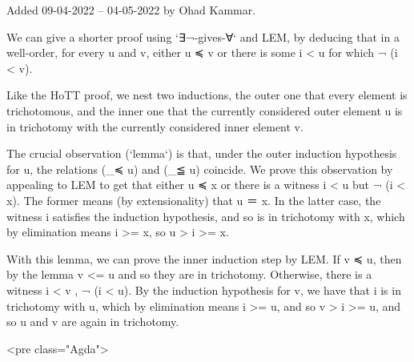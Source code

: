 Added 09-04-2022 -- 04-05-2022 by Ohad Kammar.

We can give a shorter proof using `∃¬-gives-∀` and LEM, by deducing
that in a well-order, for every u and v, either u ≼ v or there is some
i < u for which ¬ (i < v).

Like the HoTT proof, we nest two inductions, the outer one that every
element is trichotomous, and the inner one that the currently
considered outer element u is in trichotomy with the currently
considered inner element v.

The crucial observation (`lemma`) is that, under the outer induction
hypothesis for u, the relations (_≼ u) and (_≦ u) coincide. We prove
this observation by appealing to LEM to get that either u ≼ x or there
is a witness i < u but ¬ (i < x). The former means (by extensionality)
that u ＝ x. In the latter case, the witness i satisfies the induction
hypothesis, and so is in trichotomy with x, which by elimination means
i >= x, so u > i >= x.

With this lemma, we can prove the inner induction step by LEM.  If v ≼
u, then by the lemma v <= u and so they are in trichotomy.  Otherwise,
there is a witness i < v , ¬ (i < u). By the induction hypothesis for
v, we have that i is in trichotomy with u, which by elimination means
i >= u, and so v > i >= u, and so u and v are again in trichotomy.

<pre class="Agda">

